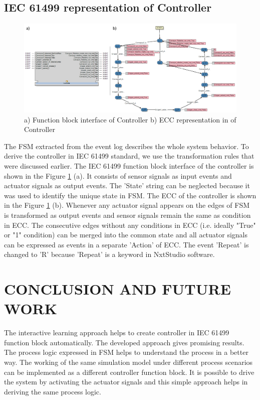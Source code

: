 \begin{bibunit}
\subsection{IEC 61499 representation of Controller}

\begin{figure}[!t]
	\centering
	\includegraphics[width=1\textwidth]{MX_Papers/Paper6/images/FB.PNG}
	\caption{a) Function block interface of Controller b) ECC representation in of Controller}
	\label{SIM_CON_ECC}
\end{figure}


The FSM extracted from the event log describes the whole system behavior. To derive the controller in IEC 61499 standard, we use the transformation rules that were discussed earlier. The IEC 61499 function block interface of the controller is shown in the Figure \ref{SIM_CON_ECC} (a). It consists of sensor signals as input events and actuator signals as output events. The 'State' string can be neglected because it was used to identify the unique state in FSM.  The ECC of the controller is shown in the Figure  \ref{SIM_CON_ECC} (b). Whenever any actuator signal appears on the edges of FSM is transformed as output events and sensor signals remain the same as condition in ECC. The consecutive edges without any conditions in ECC (i.e. ideally "True" or "1" condition)   can be merged into the common state and all actuator signals can be expressed as  events in a separate 'Action' of ECC. The event 'Repeat' is changed to 'R' because 'Repeat' is a keyword in NxtStudio software. 





\section{CONCLUSION AND FUTURE WORK}
\label{sec:conclusion}


The interactive learning approach helps to create controller in IEC 61499 function block automatically. The developed approach gives promising results. The process logic expressed in FSM helps to understand the process in a better way.  The working of the same simulation model under different process scenarios can be implemented as a different controller function block. It is possible to drive  the system by activating the actuator signals and this simple approach helps in deriving the same process logic.  



\end{bibunit}
